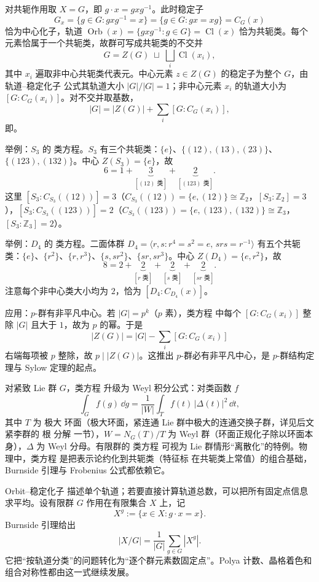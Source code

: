 对共轭作用取 $X=G$，即 $g\cdot x=gxg^{-1}$。此时稳定子
\[
G_x=\{g\in G:gxg^{-1}=x\}=\{g\in G:gx=xg\}=C_G(x)
\]
恰为中心化子，轨道 $\operatorname{Orb}(x)=\{gxg^{-1}:g\in G\}=\operatorname{Cl}(x)$ 恰为共轭类。每个元素恰属于一个共轭类，故群可写成共轭类的不交并
\[
G=Z(G)\;\sqcup\;\bigsqcup_i\operatorname{Cl}(x_i),
\]
其中 $x_i$ 遍取非中心共轭类代表元。中心元素 $z\in Z(G)$ 的稳定子为整个 $G$，由 轨道--稳定化子 公式其轨道大小 $|G|/|G|=1$；非中心元素 $x_i$ 的轨道大小为 $[G:C_G(x_i)]$。对不交并取基数，
\[
|G|=|Z(G)|+\sum_i [G:C_G(x_i)],
\]
即。

举例：$S_3$ 的 类方程。$S_3$ 有三个共轭类：$\{e\}$、$\{(12),(13),(23)\}$、$\{(123),(132)\}$。中心 $Z(S_3)=\{e\}$，故
\[
6=1+\underbrace{3}_{[(12)\text{ 类}]}+\underbrace{2}_{[(123)\text{ 类}]}.
\]
这里 $[S_3:C_{S_3}((12))]=3$（$C_{S_3}((12))=\{e,(12)\}\cong\mathbb Z_2$，$[S_3:\mathbb Z_2]=3$），$[S_3:C_{S_3}((123))]=2$（$C_{S_3}((123))=\{e,(123),(132)\}\cong\mathbb Z_3$，$[S_3:\mathbb Z_3]=2$）。

举例：$D_4$ 的 类方程。二面体群 $D_4=\langle r,s:r^4=s^2=e,\,srs=r^{-1}\rangle$ 有五个共轭类：$\{e\}$、$\{r^2\}$、$\{r,r^3\}$、$\{s,sr^2\}$、$\{sr,sr^3\}$。中心 $Z(D_4)=\{e,r^2\}$，故
\[
8=2+\underbrace{2}_{[r\text{ 类}]}+\underbrace{2}_{[s\text{ 类}]}+\underbrace{2}_{[sr\text{ 类}]}.
\]
注意每个非中心类大小均为 $2$，恰为 $[D_4:C_{D_4}(x)]$。

应用：$p$-群有非平凡中心。若 $|G|=p^k$（$p$ 素），类方程 中每个 $[G:C_G(x_i)]$ 整除 $|G|$ 且大于 $1$，故为 $p$ 的幂。于是
\[
|Z(G)|=|G|-\sum_i [G:C_G(x_i)]
\]
右端每项被 $p$ 整除，故 $p\mid |Z(G)|$。这推出 $p$-群必有非平凡中心，是 $p$-群结构定理与 Sylow 定理的起点。

对紧致 Lie 群 $G$，类方程 升级为 Weyl 积分公式：对类函数 $f$
\[
\int_G f(g)\,\dd g=\frac{1}{|W|}\int_T f(t)\,|\Delta(t)|^2\,\dd t,
\]
其中 $T$ 为 极大 环面（极大环面，紧连通 Lie 群中极大的连通交换子群，详见后文紧李群的 根 分解 一节），$W=N_G(T)/T$ 为 Weyl 群（环面正规化子除以环面本身），$\Delta$ 为 Weyl 分母。有限群的 类方程 可视为 Lie 群情形“离散化”的特例。物理中，类方程 是把表示论约化到共轭类（特征标 在共轭类上常值）的组合基础，Burnside 引理与 Frobenius 公式都依赖它。

Orbit--稳定化子 描述单个轨道；若要直接计算轨道总数，可以把所有固定点信息求平均。设有限群 $G$ 作用在有限集合 $X$ 上，记
\[
X^g:=\{x\in X:g\cdot x=x\}.
\]
Burnside 引理给出
\begin{equation}
\boxed{
|X/G|
=\frac1{|G|}\sum_{g\in G}|X^g|
}.
\label{eq:burnside-orbit-counting}
\end{equation}
它把“按轨道分类”的问题转化为“逐个群元素数固定点”。Polya 计数、晶格着色和组合对称性都由这一式继续发展。

